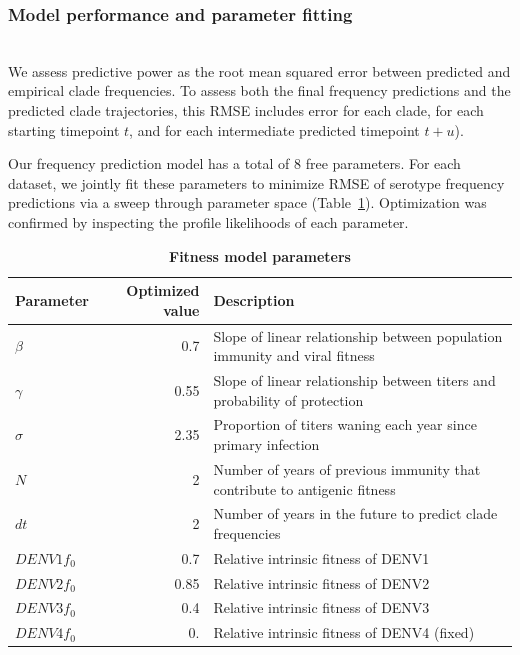 \documentclass[11pt,oneside,letterpaper]{article}
\begin{document}
\subsubsection{Model performance and parameter fitting}\\
We assess predictive power as the root mean squared error between predicted and empirical clade frequencies.
To assess both the final frequency predictions and the predicted clade trajectories, this RMSE includes error for each clade, for each starting timepoint $t$, and for each intermediate predicted timepoint $t+u$).

Our frequency prediction model has a total of 8 free parameters.
For each dataset, we jointly fit these parameters to minimize RMSE of serotype frequency predictions via a sweep through parameter space (Table~\ref{fitness_model_parameters}).
Optimization was confirmed by inspecting the profile likelihoods of each parameter.

\begin{table}[ht!]
  \begin{center}
    \label{fitness_model_parameters}
    \begin{tabular}{l|r|l}
      Parameter & Optimized value & Description\\
      \hline
      $\beta$ & 0.7 & Slope of linear relationship between population immunity and viral fitness\\
      $\gamma$ & 0.55 & Slope of linear relationship between titers and probability of protection\\
      $\sigma$ & 2.35 & Proportion of titers waning each year since primary infection\\
      $N$ & 2 & Number of years of previous immunity that contribute to antigenic fitness\\
      $dt$ & 2 & Number of years in the future to predict clade frequencies\\
      $DENV1 f_{0}$ & 0.7 & Relative intrinsic fitness of DENV1\\
      $DENV2 f_{0}$ & 0.85 & Relative intrinsic fitness of DENV2\\
      $DENV3 f_{0}$ & 0.4 & Relative intrinsic fitness of DENV3\\
      $DENV4 f_{0}$ & 0. & Relative intrinsic fitness of DENV4 (fixed)\\
    \end{tabular}
    \caption{
    \textbf{Fitness model parameters}
    }
  \end{center}
\end{table}
\end{document}
